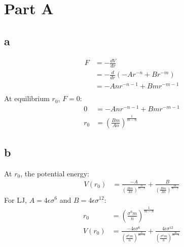 \documentclass{article}
\begin{document}
\section*{Part A}
\subsection*{a}
\begin{align*}
 F&=-\frac{dV}{dr}\\
  &=-\frac{d}{dr}(-Ar^{-n}+Br^{-m})\\
  &=-Anr^{-n-1}+Bmr^{-m-1}\\
\end{align*}
At equilibrium $r_0$, $F=0$:
\begin{align*}
 0&=-Anr^{-n-1}+Bmr^{-m-1}\\
 r_0 &=\left(\frac{Bm}{An}\right)^{\frac{1}{m-n}}
\end{align*}
\subsection*{b}
At $r_0$, the potential energy:
\begin{align*}
 V(r_0) &=\frac{-A}{\left(\frac{Bm}{An}\right)^{\frac{n}{m-n}}}+\frac{B}{\left(\frac{Bm}{An}\right)^{\frac{m}{m-n}}}
\end{align*}
For LJ, $A=4\epsilon \sigma ^6$ and $B=4\epsilon \sigma ^{12}$:
\begin{align*}
 r_0 &=\left(\frac{\sigma ^{6}m}{n}\right)^{\frac{1}{m-n}}\\
 V(r_0) &=\frac{-4\epsilon \sigma ^6}{\left(\frac{\sigma ^{6}m}{n}\right)^{\frac{n}{m-n}}}+\frac{4\epsilon \sigma ^{12}}{\left(\frac{\sigma ^{6}m}{n}\right)^{\frac{m}{m-n}}}
\end{align*}
\end{document}
